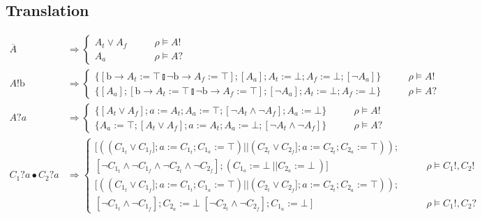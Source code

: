 \documentclass{article}
\begin{document}
\subsection{Translation}
\begin{align*}
    \overline{A} & \Rightarrow \left\{ \begin{matrix} A_t \vee A_f & \qquad \rho \vDash A! \\ A_a & \qquad \rho \vDash A? \end{matrix} \right. \\
    A!\mathrm{b} & \Rightarrow \left\{ \begin{matrix} \{[\mathrm{b} \rightarrow A_t := \top \talloblong \neg \mathrm{b} \rightarrow A_f := \top]; [A_a]; A_t := \bot; A_f := \bot; [\neg A_a]\} & \qquad \rho \vDash A! \\
                                                      \{[A_a]; [\mathrm{b} \rightarrow A_t := \top \talloblong \neg \mathrm{b} \rightarrow A_f := \top]; [\neg A_a]; A_t := \bot; A_f := \bot\} & \qquad \rho \vDash A? \end{matrix} \right. \\
    A?a & \Rightarrow \left\{ \begin{matrix} \{[A_t \vee A_f]; a := A_t; A_a := \top; [\neg A_t \wedge \neg A_f]; A_a := \bot\} & \qquad \rho \vDash A! \\
                                             \{A_a := \top; [A_t \vee A_f]; a := A_t; A_a := \bot; [\neg A_t \wedge \neg A_f]\} & \qquad \rho \vDash A? \end{matrix} \right. \\
    C_1?a \bullet C_2?a & \Rightarrow \left\{ \begin{matrix} [ ((C_{1_t} \vee C_{1_f}]; a := C_{1_t}; C_{1_a} := \top) || (C_{2_t} \vee C_{2_f}]; a := C_{2_t}; C_{2_a} := \top)); 
    \\ [\neg C_{1_t} \wedge \neg C_{1_f} \wedge \neg C_{2_t} \wedge \neg C_{2_f}]; (C_{1_a} := \bot\ ||C_{2_a} := \bot\ ) ]& \qquad \rho \vDash C_1!, C_2! \\
     [ ((C_{1_t} \vee C_{1_f}]; a := C_{1_t}; C_{1_a} := \top) || (C_{2_t} \vee C_{2_f}]; a := C_{2_t}; C_{2_a} := \top)); 
    \\ [\neg C_{1_t} \wedge \neg C_{1_f}];  C_{2_a} := \bot\; [ \neg C_{2_t} \wedge \neg C_{2_f}]; C_{1_a} := \bot\ ]& \qquad \rho \vDash C_1!, C_2?
      \end{matrix} \right.  \\

\end{align*}
\end{document}
